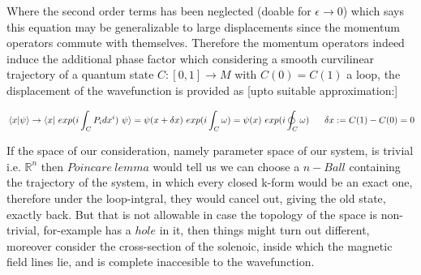 \documentclass[8pt, twocoloumn]{article}
\begin{document}
 Where the second order terms has been neglected (doable for $\epsilon \to 0$) which says this equation may be generalizable to large displacements since the momentum operators commute with themselves. Therefore the momentum operators indeed induce the additional phase factor which considering a smooth curvilinear trajectory of a quantum state $C:[0,1] \to M$ with $C(0)=C(1)$ a loop, the displacement of the wavefunction is provided as [upto suitable approximation:]

\begin{align}{\label{huha}}
 \braket{x|\psi} \to \braket{x| \ exp(i\int_{C}P_i dx^i) \ \psi}=\psi(x+\delta x) \ exp (i\int_{C}\omega) = \psi(x) \ exp (i \oint_{C}\omega) \ \ \ \ \ \delta x := C(1)-C(0)=0
\end{align}

If the space of our consideration, namely parameter space of our system, is trivial i.e. $\mathbb{R}^n$ then $Poincare \ lemma$ would tell us we can choose a $n-Ball$ containing the trajectory of the system, in which every closed k-form would be an exact one, therefore under the loop-intgral, they would cancel out, giving the old state, exactly back. But that is not allowable in case the topology of the space is non-trivial, for-example has a $hole$ in it, then things might turn out different, moreover consider the cross-section of the solenoic, inside which the magnetic field lines lie, and is complete inaccesible to the wavefunction.
\end{document}
